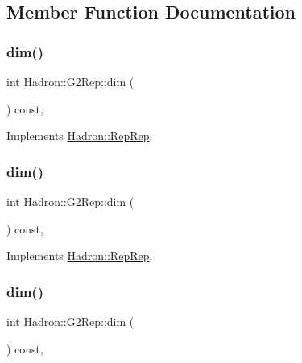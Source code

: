 \subsection{Member Function Documentation}
\mbox{\label{structHadron_1_1G2Rep_a7c8d894ff5da6fead1964484c04a4c80}} 
\subsubsection{\texorpdfstring{dim()}{dim()}\hspace{0.1cm}{\footnotesize\ttfamily [1/5]}}
{\footnotesize\ttfamily int Hadron\+::\+G2\+Rep\+::dim (\begin{DoxyParamCaption}{ }\end{DoxyParamCaption}) const\hspace{0.3cm}{\ttfamily [inline]}, {\ttfamily [virtual]}}



Implements \mbox{\hyperlink{structHadron_1_1RepRep_a92c8802e5ed7afd7da43ccfd5b7cd92b}{Hadron\+::\+Rep\+Rep}}.

\mbox{\label{structHadron_1_1G2Rep_a7c8d894ff5da6fead1964484c04a4c80}} 
\subsubsection{\texorpdfstring{dim()}{dim()}\hspace{0.1cm}{\footnotesize\ttfamily [2/5]}}
{\footnotesize\ttfamily int Hadron\+::\+G2\+Rep\+::dim (\begin{DoxyParamCaption}{ }\end{DoxyParamCaption}) const\hspace{0.3cm}{\ttfamily [inline]}, {\ttfamily [virtual]}}



Implements \mbox{\hyperlink{structHadron_1_1RepRep_a92c8802e5ed7afd7da43ccfd5b7cd92b}{Hadron\+::\+Rep\+Rep}}.

\mbox{\label{structHadron_1_1G2Rep_a7c8d894ff5da6fead1964484c04a4c80}} 
\subsubsection{\texorpdfstring{dim()}{dim()}\hspace{0.1cm}{\footnotesize\ttfamily [3/5]}}
{\footnotesize\ttfamily int Hadron\+::\+G2\+Rep\+::dim (\begin{DoxyParamCaption}{ }\end{DoxyParamCaption}) const\hspace{0.3cm}{\ttfamily [inline]}, {\ttfamily [virtual]}}



